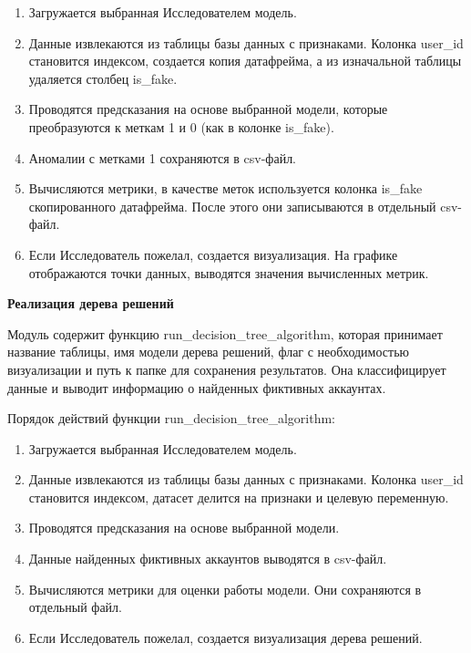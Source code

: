 \begin{enumerate}[itemindent=2cm, leftmargin=0cm, labelsep=0.3cm, topsep=0cm, itemsep=0cm, parsep=0cm, label=\arabic*., after=\vspace{-0.1cm}, before=\vspace{-0.1cm}]
    \item Загружается выбранная Исследователем модель.
    \item Данные извлекаются из таблицы базы данных с признаками. Колонка user\_id становится индексом, создается копия датафрейма, а из изначальной таблицы удаляется столбец is\_fake.
    \item Проводятся предсказания на основе выбранной модели, которые преобразуются к меткам 1 и 0 (как в колонке is\_fake).
    \item Аномалии с метками 1 сохраняются в csv-файл.
    \item Вычисляются метрики, в качестве меток используется колонка is\_fake скопированного датафрейма. После этого они записываются в отдельный csv-файл.
    \item Если Исследователь пожелал, создается визуализация. На графике отображаются точки данных, выводятся значения вычисленных метрик.
\end{enumerate}


\vspace{-1.5em}
\textbf{Реализация дерева решений}

Модуль содержит функцию run\_decision\_tree\_algorithm, которая принимает название таблицы, имя модели дерева решений, флаг с необходимостью визуализации и путь к папке для сохранения результатов. Она классифицирует данные и выводит информацию о найденных фиктивных аккаунтах.

Порядок действий функции run\_decision\_tree\_algorithm:

\begin{enumerate}[itemindent=2cm, leftmargin=0cm, labelsep=0.3cm, topsep=0cm, itemsep=0cm, parsep=0cm, label=\arabic*., after=\vspace{-0.1cm}, before=\vspace{-0.1cm}]
    \item Загружается выбранная Исследователем модель.
    \item Данные извлекаются из таблицы базы данных с признаками. Колонка user\_id становится индексом, датасет делится на признаки и целевую переменную.
    \item Проводятся предсказания на основе выбранной модели.
    \item Данные найденных фиктивных аккаунтов выводятся в csv-файл.
    \item Вычисляются метрики для оценки работы модели. Они сохраняются в отдельный файл.
    \item Если Исследователь пожелал, создается визуализация дерева решений.
\end{enumerate}


